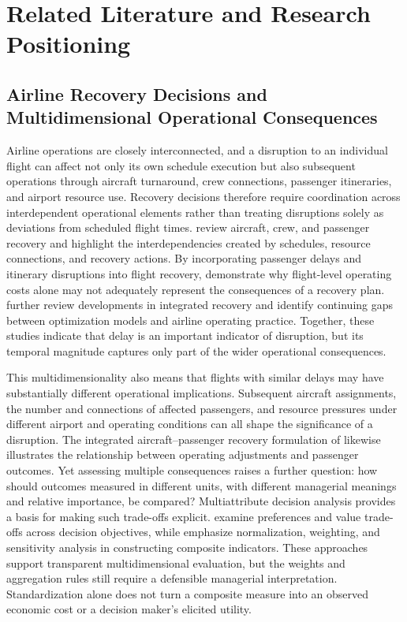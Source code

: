 \section{Related Literature and Research Positioning}
\label{sec:related_work}

\subsection{Airline Recovery Decisions and Multidimensional Operational Consequences}
\label{subsec:rw_recovery}

Airline operations are closely interconnected, and a disruption to an individual flight can affect not only its own schedule execution but also subsequent operations through aircraft turnaround, crew connections, passenger itineraries, and airport resource use. Recovery decisions therefore require coordination across interdependent operational elements rather than treating disruptions solely as deviations from scheduled flight times. \citet{clausenDisruptionManagementAirline2010} review aircraft, crew, and passenger recovery and highlight the interdependencies created by schedules, resource connections, and recovery actions. By incorporating passenger delays and itinerary disruptions into flight recovery, \citet{bratuFlightOperationsRecovery2006} demonstrate why flight-level operating costs alone may not adequately represent the consequences of a recovery plan. \citet{hassanAirlineDisruptionManagement2021} further review developments in integrated recovery and identify continuing gaps between optimization models and airline operating practice. Together, these studies indicate that delay is an important indicator of disruption, but its temporal magnitude captures only part of the wider operational consequences.

This multidimensionality also means that flights with similar delays may have substantially different operational implications. Subsequent aircraft assignments, the number and connections of affected passengers, and resource pressures under different airport and operating conditions can all shape the significance of a disruption. The integrated aircraft--passenger recovery formulation of \citet{arikanIntegratedAircraftPassenger2016} likewise illustrates the relationship between operating adjustments and passenger outcomes. Yet assessing multiple consequences raises a further question: how should outcomes measured in different units, with different managerial meanings and relative importance, be compared? Multiattribute decision analysis provides a basis for making such trade-offs explicit. \citet{keeneyRaiffaDecisionsMultipleObjectives1976} examine preferences and value trade-offs across decision objectives, while \citet{oecdCompositeIndicators2008} emphasize normalization, weighting, and sensitivity analysis in constructing composite indicators. These approaches support transparent multidimensional evaluation, but the weights and aggregation rules still require a defensible managerial interpretation. Standardization alone does not turn a composite measure into an observed economic cost or a decision maker's elicited utility.

